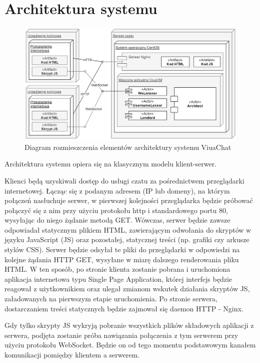 \section{Architektura systemu}
\label{chat_architektura_systemu}

\begin{figure}[!htp]
	\centering
	\includegraphics[width=\textwidth]{chat/fig/deploy-diag}
	\caption{Diagram rozmieszczenia elementów architektury systemu ViuaChat}
	\label{diag-komp}
\end{figure}

Architektura systemu opiera się na klasycznym modelu klient-serwer.

Klienci będą uzyskiwali dostęp do usługi czatu za pośrednictwem przeglądarki
internetowej. Łącząc się z podanym adresem (IP lub domeny), na którym połączeń
nasłuchuje serwer, w pierwszej kolejności przeglądarka będzie próbować połączyć
się z nim przy użyciu protokołu http i standardowego portu 80, wysyłając do
niego żądanie metodą GET. Wówczas, serwer będzie zawsze odpowiadał statycznym
plikiem HTML, zawierającym odwołania do skryptów w języku JavaScript (JS) oraz
pozostałej, statycznej treści (np. grafiki czy arkusze stylów CSS). Serwer
będzie odsyłał te pliki do przeglądarki w odpowiedzi na kolejne żądania HTTP
GET, wysyłane w miarę dalszego renderowania pliku HTML. W ten sposób, po
stronie klienta zostanie pobrana i uruchomiona aplikacja internetowa typu
Single Page
Application, której interfejs będzie reagował z użytkownikiem oraz ulegał
zmianom wskutek działania skryptów JS, załadowanych na pierwszym etapie
uruchomienia. Po stronie serwera, dostarczaniem treści statycznych będzie
zajmował się daemon HTTP - Nginx.

Gdy tylko skrypty JS wykryją pobranie wszystkich plików składowych aplikacji
z serwera, podjęta zostanie próba nawiązania połączenia z tym serwerem przy
użyciu protokołu WebSocket. Będzie on od tego momentu podstawowym kanałem
komunikacji pomiędzy klientem a serwerem.


